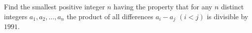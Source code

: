 Find the smallest positive integer $n$ having the property that for any $n$ distinct integers $a_1, a_2, \dots , a_n$ the product of all differences $a_i-a_j$ $(i < j)$ is divisible by $1991$.